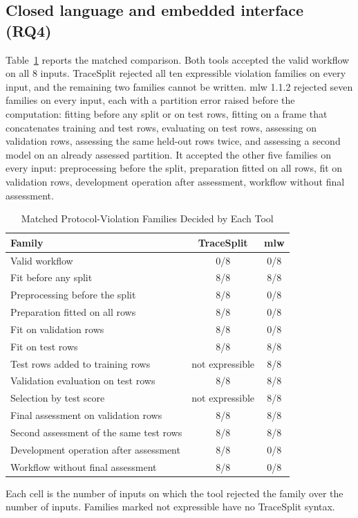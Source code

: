 \documentclass[lettersize,journal]{IEEEtran}
\newcommand{\tool}{TraceSplit}
\begin{document}
\subsection{Closed language and embedded interface (RQ4)}\label{sec:comparison}
Table~\ref{tab:comparison} reports the matched comparison. Both tools accepted the valid workflow on all 8 inputs. \tool{} rejected all ten expressible violation families on every input, and the remaining two families cannot be written. mlw 1.1.2 rejected seven families on every input, each with a partition error raised before the computation: fitting before any split or on test rows, fitting on a frame that concatenates training and test rows, evaluating on test rows, assessing on validation rows, assessing the same held-out rows twice, and assessing a second model on an already assessed partition. It accepted the other five families on every input: preprocessing before the split, preparation fitted on all rows, fit on validation rows, development operation after assessment, workflow without final assessment.

\begin{table}[t]
\caption{Matched Protocol-Violation Families Decided by Each Tool}
\label{tab:comparison}\centering\footnotesize
\setlength{\tabcolsep}{4pt}
\begin{tabular}{p{}cc}\toprule
Family & \tool{} & mlw\\\midrule
Valid workflow & 0/8 & 0/8\\
Fit before any split & 8/8 & 8/8\\
Preprocessing before the split & 8/8 & 0/8\\
Preparation fitted on all rows & 8/8 & 0/8\\
Fit on validation rows & 8/8 & 0/8\\
Fit on test rows & 8/8 & 8/8\\
Test rows added to training rows & not expressible & 8/8\\
Validation evaluation on test rows & 8/8 & 8/8\\
Selection by test score & not expressible & 8/8\\
Final assessment on validation rows & 8/8 & 8/8\\
Second assessment of the same test rows & 8/8 & 8/8\\
Development operation after assessment & 8/8 & 0/8\\
Workflow without final assessment & 8/8 & 0/8\\
\bottomrule
\end{tabular}

\smallskip
\parbox{0.95\columnwidth}{\footnotesize Each cell is the number of inputs on which the tool rejected the family over the number of inputs. Families marked not expressible have no \tool{} syntax.}
\end{table}
\end{document}
